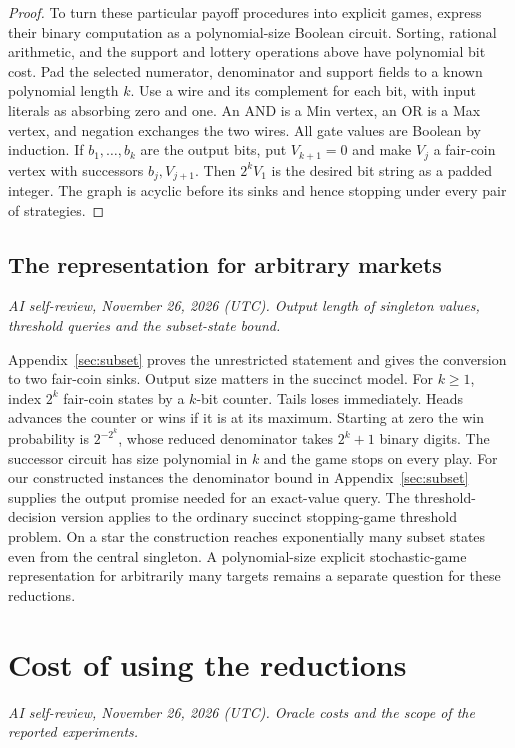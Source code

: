 \documentclass[11pt,oneside,openany,notitlepage]{report}
\newcommand{\reviewdate}{November 26, 2026 (UTC)}
\newcommand{\reviewmark}[1]{\par\nopagebreak[4]\noindent
  {\footnotesize\itshape AI self-review, \reviewdate. #1\par}\nobreak\smallskip}
\begin{document}
\begin{proof}
To turn these particular payoff procedures into explicit games, express
their binary computation as a polynomial-size Boolean circuit. Sorting,
rational arithmetic, and the support and lottery operations above have
polynomial bit cost. Pad the selected numerator, denominator and support
fields to a known polynomial length \(k\). Use a wire and its complement
for each bit, with input literals as absorbing zero and one. An AND is a
Min vertex, an OR is a Max vertex, and negation exchanges the two wires.
All gate values are Boolean by induction. If \(b_1,\ldots,b_k\) are the
output bits, put \(V_{k+1}=0\) and make \(V_j\) a fair-coin vertex with
successors \(b_j,V_{j+1}\). Then \(2^kV_1\) is the desired bit string as
a padded integer. The graph is acyclic before its sinks and hence
stopping under every pair of strategies.
\end{proof}

\section{The representation for arbitrary markets}
\reviewmark{Output length of singleton values, threshold queries and the subset-state bound.}
Appendix~\ref{sec:subset} proves the unrestricted statement and gives
the conversion to two fair-coin sinks. Output size matters in the succinct
model. For \(k\ge1\), index \(2^k\) fair-coin states by a \(k\)-bit
counter. Tails loses immediately. Heads advances the counter or wins if
it is at its maximum. Starting at zero the win probability is
\(2^{-2^k}\), whose reduced denominator takes \(2^k+1\) binary digits.
The successor circuit has size polynomial in \(k\) and the game stops
on every play. For our constructed instances the denominator bound in
Appendix~\ref{sec:subset} supplies the output promise needed for an
exact-value query. The threshold-decision version applies to the ordinary
succinct stopping-game threshold problem. On a star the construction reaches
exponentially many subset states even from the central singleton. A
polynomial-size explicit stochastic-game representation for arbitrarily
many targets remains a separate question for these reductions.

\chapter{Cost of using the reductions}\label{sec:scope}
\reviewmark{Oracle costs and the scope of the reported experiments.}
\end{document}
